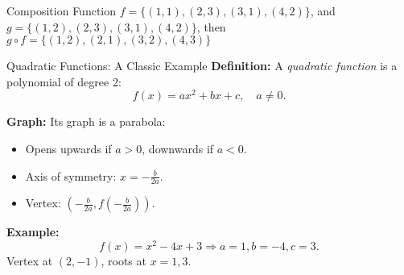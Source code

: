 \documentclass[11pt]{beamer}
\theoremstyle{plain}
\begin{document}

\begin{frame}{Composition Function}
    $f = \{(1, 1), (2, 3), (3, 1), (4, 2)\}$, and $g = \{(1, 2), (2, 3), (3, 1), (4, 2)\}$, then $g \circ f = \{(1, 2), (2, 1), (3, 2), (4, 3)\}$
\end{frame}










\begin{frame}{Quadratic Functions: A Classic Example}
\textbf{Definition:}  
A \emph{quadratic function} is a polynomial of degree 2:
\[
f(x) = ax^2 + bx + c, \quad a \neq 0.
\]

\textbf{Graph:}  
Its graph is a parabola:
\begin{itemize}
    \item Opens upwards if $a > 0$, downwards if $a < 0$.
    \item Axis of symmetry: $x = -\frac{b}{2a}$.
    \item Vertex: $\left(-\frac{b}{2a}, f\!\left(-\frac{b}{2a}\right)\right)$.
\end{itemize}

\textbf{Example:}  
\[
f(x) = x^2 - 4x + 3 \Rightarrow a=1,b=-4,c=3.
\]
Vertex at $(2,-1)$, roots at $x=1,3$.
\end{frame}
\end{document}
